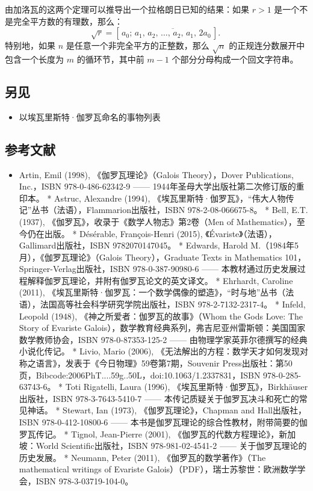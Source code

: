 由加洛瓦的这两个定理可以推导出一个拉格朗日已知的结果：如果 $r > 1$ 是一个不是完全平方数的有理数，那么：
$$
\sqrt{r} = \left[\,a_0;\, \overline{a_1,\,a_2,\,\dots,\,a_2,\,a_1,\,2a_0}\,\right].~
$$
特别地，如果 $n$ 是任意一个非完全平方的正整数，那么 $\sqrt{n}$ 的正规连分数展开中包含一个长度为 $m$ 的循环节，其中前 $m - 1$ 个部分分母构成一个回文字符串。
\subsection{另见}
\begin{itemize}
\item 以埃瓦里斯特·伽罗瓦命名的事物列表
\end{itemize}
\subsection{参考文献}
\begin{itemize}
\item Artin, Emil (1998), 《伽罗瓦理论》（Galois Theory），Dover Publications, Inc.，ISBN 978-0-486-62342-9 —— 1944年圣母大学出版社第二次修订版的重印本。
* Astruc, Alexandre (1994), 《埃瓦里斯特·伽罗瓦》，“伟大人物传记”丛书（法语），Flammarion出版社，ISBN 978-2-08-066675-8。
* Bell, E.T. (1937), 《伽罗瓦》，收录于《数学人物志》第2卷（Men of Mathematics），至今仍在出版。
* Désérable, François-Henri (2015), 《Évariste》（法语），Gallimard出版社，ISBN 9782070147045。
* Edwards, Harold M.（1984年5月），《伽罗瓦理论》（Galois Theory），Graduate Texts in Mathematics 101，Springer-Verlag出版社，ISBN 978-0-387-90980-6 —— 本教材通过历史发展过程解释伽罗瓦理论，并附有伽罗瓦论文的英文译文。
* Ehrhardt, Caroline (2011), 《埃瓦里斯特·伽罗瓦：一个数学偶像的塑造》，“时与地”丛书（法语），法国高等社会科学研究学院出版社，ISBN 978-2-7132-2317-4。
* Infeld, Leopold (1948), 《神之所爱者：伽罗瓦的故事》（Whom the Gods Love: The Story of Evariste Galois），数学教育经典系列，弗吉尼亚州雷斯顿：美国国家数学教师协会，ISBN 978-0-87353-125-2 —— 由物理学家英菲尔德撰写的经典小说化传记。
* Livio, Mario (2006), 《无法解出的方程：数学天才如何发现对称之语言》，发表于《今日物理》59卷第7期，Souvenir Press出版社：第50页，Bibcode:2006PhT....59g..50L，doi:10.1063/1.2337831，ISBN 978-0-285-63743-6。
* Toti Rigatelli, Laura (1996), 《埃瓦里斯特·伽罗瓦》，Birkhäuser出版社，ISBN 978-3-7643-5410-7 —— 本传记质疑关于伽罗瓦决斗和死亡的常见神话。
* Stewart, Ian (1973), 《伽罗瓦理论》，Chapman and Hall出版社，ISBN 978-0-412-10800-6 —— 本书是伽罗瓦理论的综合性教材，附带简要的伽罗瓦传记。
* Tignol, Jean-Pierre (2001), 《伽罗瓦的代数方程理论》，新加坡：World Scientific出版社，ISBN 978-981-02-4541-2 —— 关于伽罗瓦理论的历史发展。
* Neumann, Peter (2011), 《伽罗瓦的数学著作》（The mathematical writings of Evariste Galois）（PDF），瑞士苏黎世：欧洲数学学会，ISBN 978-3-03719-104-0。
\end{itemize}

